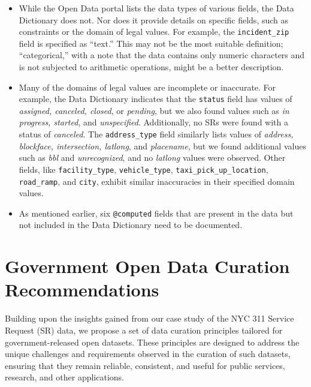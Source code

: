 \documentclass[linenumber]{jdsart}
\begin{document}
\begin{itemize}
    \item While the Open Data portal lists the data types of various 
    fields, the Data Dictionary does not. Nor does it provide details 
    on specific fields, such as constraints or the domain of legal 
    values. For example, the \texttt{incident\_zip} field is specified 
    as ``text.'' This may not be the most suitable definition; 
    ``categorical,'' with a note that the data contains only numeric 
    characters and is not subjected to arithmetic operations, might 
    be a better description.
    
    \item Many of the domains of legal values are incomplete or 
    inaccurate. For example, the Data Dictionary indicates that the 
    \texttt{status} field has values of \textit{assigned, canceled, 
    closed}, or \textit{pending}, but we also found values such as 
    \textit{in progress, started}, and \textit{unspecified}. 
    Additionally, no SRs were found with a status of 
    \textit{canceled}. The \texttt{address\_type} field similarly 
    lists values of \textit{address, blockface, intersection, latlong}, 
    and \textit{placename}, but we found additional values such as 
    \textit{bbl} and \textit{unrecognized}, and no \textit{latlong} 
    values were observed. Other fields, like \texttt{facility\_type}, 
    \texttt{vehicle\_type}, \texttt{taxi\_pick\_up\_location}, 
    \texttt{road\_ramp}, and \texttt{city}, exhibit similar inaccuracies 
    in their specified domain values.
    
  \item As mentioned earlier, six \texttt{@computed} fields that are
    present in the data but not included in the Data Dictionary need
    to be documented.
\end{itemize}


\section{Government Open Data Curation Recommendations}
\label{sec:recommendations}
Building upon the insights gained from our case study of the 
NYC 311 Service Request (SR) data, we propose a set of data 
curation principles tailored for government-released open datasets. 
These principles are designed to address the unique challenges 
and requirements observed in the curation of such datasets, 
ensuring that they remain reliable, consistent, and useful for 
public services, research, and other applications.
\end{document}

